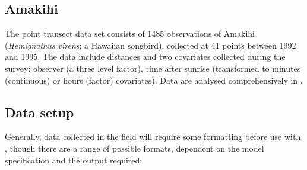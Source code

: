 \documentclass[article]{jss}
\begin{document}
\subsection{Amakihi}

The point transect data set consists of 1485 observations of Amakihi (\textit{Hemignathus virens}; a Hawaiian songbird), collected at 41 points between 1992 and 1995. The data include distances and two covariates collected during the survey: observer (a three level factor), time after sunrise (transformed to minutes (continuous) or hours (factor) covariates). Data are analysed comprehensively in \cite{Marques:2007ey}.

\subsection{Data setup}

Generally, data collected in the field will require some formatting before use with , though there are a range of possible formats, dependent on the model specification and the output required:
\end{document}

